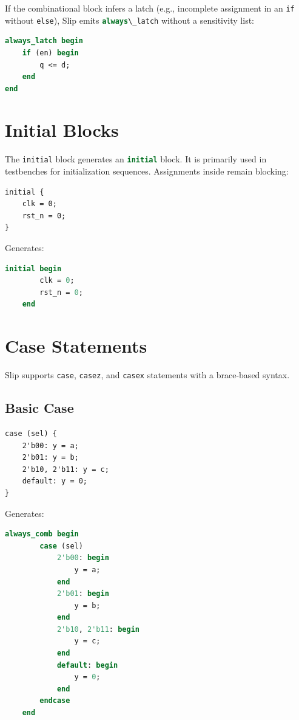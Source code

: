 \documentclass[lang=en,11pt]{elegantbook}
\newcommand{\code}[1]{\texttt{#1}}
\newcommand{\svinline}[1]{\lstinline[language=SystemVerilog]|#1|}
\begin{document}
If the combinational block infers a latch (e.g., incomplete assignment in an \code{if} without \code{else}), Slip emits \svinline{always\_latch} without a sensitivity list:

\begin{lstlisting}[language=SystemVerilog]
always_latch begin
    if (en) begin
        q <= d;
    end
end
\end{lstlisting}

\chapter{Initial Blocks}

The \code{initial} block generates an \svinline{initial} block. It is primarily used in testbenches for initialization sequences. Assignments inside remain blocking:

\begin{lstlisting}[language=Slip]
initial {
    clk = 0;
    rst_n = 0;
}
\end{lstlisting}

Generates:

\begin{lstlisting}[language=SystemVerilog]
    initial begin
        clk = 0;
        rst_n = 0;
    end
\end{lstlisting}

\chapter{Case Statements}

Slip supports \code{case}, \code{casez}, and \code{casex} statements with a brace-based syntax.

\section{Basic Case}

\begin{lstlisting}[language=Slip]
case (sel) {
    2'b00: y = a;
    2'b01: y = b;
    2'b10, 2'b11: y = c;
    default: y = 0;
}
\end{lstlisting}

Generates:

\begin{lstlisting}[language=SystemVerilog]
    always_comb begin
        case (sel)
            2'b00: begin
                y = a;
            end
            2'b01: begin
                y = b;
            end
            2'b10, 2'b11: begin
                y = c;
            end
            default: begin
                y = 0;
            end
        endcase
    end
\end{lstlisting}
\end{document}
